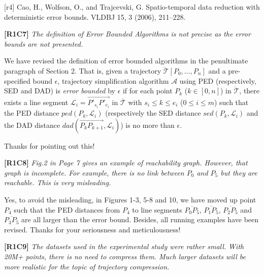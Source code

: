 \documentclass{letter}
\newcommand{\kw}[1]{{\ensuremath {\mathsf{#1}}}\xspace}
\newcommand{\ie}{\emph{i.e.,}\xspace}
\newcommand{\vv}{\overrightarrow}
\begin{document}
{[r4] Cao, H., Wolfson, O., and Trajcevski, G. Spatio-temporal data reduction with deterministic error bounds. VLDBJ 15, 3 (2006), 211–228.

\textbf{[R1C7]} \emph{ The definition of Error Bounded Algorithms is not precise as the error bounds are not presented. }

We have revised the definition of error bounded algorithms in the penultimate paragraph of Section 2. That is, given a trajectory $\dddot{\mathcal{T}}\left[P_0, \dots, P_n\right]$ and a pre-specified bound $\epsilon$,
trajectory simplification algorithm $\mathcal{A}$ using PED (respectively, SED and DAD) is \emph{error bounded} by $\epsilon$ if for each point $P_k$ ($k\in[0,n]$) in $\dddot{\mathcal{T}}$, there exists a line segment $\mathcal{L}_i = \vv{P'_{s_i}P'_{e_i}}$ in $\overline{\mathcal{T}}$ with $s_i \le k \le e_i$ ($0\le i\le m$) such that the PED distance $ped\left(P_k, \mathcal{L}_i\right)$  (respectively the SED distance $sed\left(P_k, \mathcal{L}_i\right)$ and the DAD distance $dad\left(\vv{P_{k}P_{k+1}}, \mathcal{L}_i\right)$) is no more than  $\epsilon$.

Thanks for pointing out this!


\textbf{[R1C8]} \emph{ Fig.2 in Page 7 gives an example of reachability graph. However, that graph is incomplete. For example, there is no link between $P_0$ and $P_5$ but they are reachable. This is very misleading. }

Yes, to avoid the misleading, in Figures 1-3, 5-8 and 10, we have moved up point $P_4$ such that the PED distances from $P_4$ to line segments $\overline{P_0P_5}$, $\overline{P_1P_5}$, $\overline{P_2P_5}$ and $\overline{P_3P_5}$ are all larger than the error bound. Besides, all running examples have been revised.
Thanks for your seriousness and meticulousness!






\textbf{[R1C9]} \emph{ The datasets used in the experimental study were rather small. With 20M+ points, there is no need to compress them. Much larger datasets will be more realistic for the topic of trajectory compression.  }

}
\end{document}
